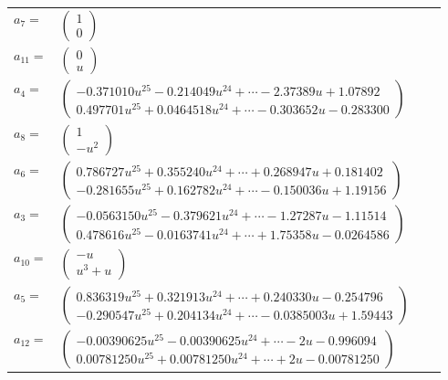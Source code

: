 \documentclass[1p]{elsarticle_modified}
\theoremstyle{definition}
\begin{document}
\begin{tabular}{m{7pt} m{180pt} m{7pt} m{180pt} }
\flushright $a_{7}=$&$\begin{pmatrix}1\\0\end{pmatrix}$ \\
\flushright $a_{11}=$&$\begin{pmatrix}0\\u\end{pmatrix}$ \\
\flushright $a_{4}=$&$\begin{pmatrix}-0.371010 u^{25}-0.214049 u^{24}+\cdots-2.37389 u+1.07892\\0.497701 u^{25}+0.0464518 u^{24}+\cdots-0.303652 u-0.283300\end{pmatrix}$ \\
\flushright $a_{8}=$&$\begin{pmatrix}1\\- u^2\end{pmatrix}$ \\
\flushright $a_{6}=$&$\begin{pmatrix}0.786727 u^{25}+0.355240 u^{24}+\cdots+0.268947 u+0.181402\\-0.281655 u^{25}+0.162782 u^{24}+\cdots-0.150036 u+1.19156\end{pmatrix}$ \\
\flushright $a_{3}=$&$\begin{pmatrix}-0.0563150 u^{25}-0.379621 u^{24}+\cdots-1.27287 u-1.11514\\0.478616 u^{25}-0.0163741 u^{24}+\cdots+1.75358 u-0.0264586\end{pmatrix}$ \\
\flushright $a_{10}=$&$\begin{pmatrix}- u\\u^3+u\end{pmatrix}$ \\
\flushright $a_{5}=$&$\begin{pmatrix}0.836319 u^{25}+0.321913 u^{24}+\cdots+0.240330 u-0.254796\\-0.290547 u^{25}+0.204134 u^{24}+\cdots-0.0385003 u+1.59443\end{pmatrix}$ \\
\flushright $a_{12}=$&$\begin{pmatrix}-0.00390625 u^{25}-0.00390625 u^{24}+\cdots-2 u-0.996094\\0.00781250 u^{25}+0.00781250 u^{24}+\cdots+2 u-0.00781250\end{pmatrix}$ \\

\end{tabular}
\end{document}
